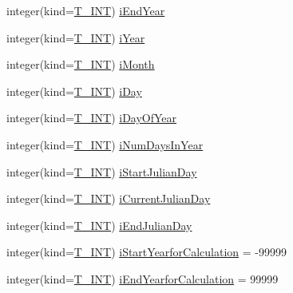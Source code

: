 \begin{DoxyCompactItemize}
integer(kind=\hyperlink{namespacetypes_a4e4d040a4425196c4d43be63e7e6103a}{T\_\-INT}) \hyperlink{typetypes_1_1_t___m_o_d_e_l___c_o_n_f_i_g_u_r_a_t_i_o_n_a82467f5e064c49d1bef630769ab87771}{iEndYear}
\item 
integer(kind=\hyperlink{namespacetypes_a4e4d040a4425196c4d43be63e7e6103a}{T\_\-INT}) \hyperlink{typetypes_1_1_t___m_o_d_e_l___c_o_n_f_i_g_u_r_a_t_i_o_n_a485ce8a8aa6a892ba29008cd882d2af9}{iYear}
\item 
integer(kind=\hyperlink{namespacetypes_a4e4d040a4425196c4d43be63e7e6103a}{T\_\-INT}) \hyperlink{typetypes_1_1_t___m_o_d_e_l___c_o_n_f_i_g_u_r_a_t_i_o_n_a7bf078a917b57832ed52f1535ab13b67}{iMonth}
\item 
integer(kind=\hyperlink{namespacetypes_a4e4d040a4425196c4d43be63e7e6103a}{T\_\-INT}) \hyperlink{typetypes_1_1_t___m_o_d_e_l___c_o_n_f_i_g_u_r_a_t_i_o_n_aa509946cbf46ac785453b3c2e047d277}{iDay}
\item 
integer(kind=\hyperlink{namespacetypes_a4e4d040a4425196c4d43be63e7e6103a}{T\_\-INT}) \hyperlink{typetypes_1_1_t___m_o_d_e_l___c_o_n_f_i_g_u_r_a_t_i_o_n_afd430e9a2429e881bbfcccb7386d0fb4}{iDayOfYear}
\item 
integer(kind=\hyperlink{namespacetypes_a4e4d040a4425196c4d43be63e7e6103a}{T\_\-INT}) \hyperlink{typetypes_1_1_t___m_o_d_e_l___c_o_n_f_i_g_u_r_a_t_i_o_n_ab415d727eca597e6f062a4be8321945d}{iNumDaysInYear}
\item 
integer(kind=\hyperlink{namespacetypes_a4e4d040a4425196c4d43be63e7e6103a}{T\_\-INT}) \hyperlink{typetypes_1_1_t___m_o_d_e_l___c_o_n_f_i_g_u_r_a_t_i_o_n_a5a398843408a58b46073f40a70b375d3}{iStartJulianDay}
\item 
integer(kind=\hyperlink{namespacetypes_a4e4d040a4425196c4d43be63e7e6103a}{T\_\-INT}) \hyperlink{typetypes_1_1_t___m_o_d_e_l___c_o_n_f_i_g_u_r_a_t_i_o_n_a7e0801a2cadc8f1c100a1c2405ecf091}{iCurrentJulianDay}
\item 
integer(kind=\hyperlink{namespacetypes_a4e4d040a4425196c4d43be63e7e6103a}{T\_\-INT}) \hyperlink{typetypes_1_1_t___m_o_d_e_l___c_o_n_f_i_g_u_r_a_t_i_o_n_a00e60b13d32a2025c8ba50e5e50ccee8}{iEndJulianDay}
\item 
integer(kind=\hyperlink{namespacetypes_a4e4d040a4425196c4d43be63e7e6103a}{T\_\-INT}) \hyperlink{typetypes_1_1_t___m_o_d_e_l___c_o_n_f_i_g_u_r_a_t_i_o_n_adbf87a23506af5cf11fa0ffca4dec91d}{iStartYearforCalculation} = -\/99999
\item 
integer(kind=\hyperlink{namespacetypes_a4e4d040a4425196c4d43be63e7e6103a}{T\_\-INT}) \hyperlink{typetypes_1_1_t___m_o_d_e_l___c_o_n_f_i_g_u_r_a_t_i_o_n_afa83738f35facf3b13927fc208f45dee}{iEndYearforCalculation} = 99999

\end{DoxyCompactItemize}
